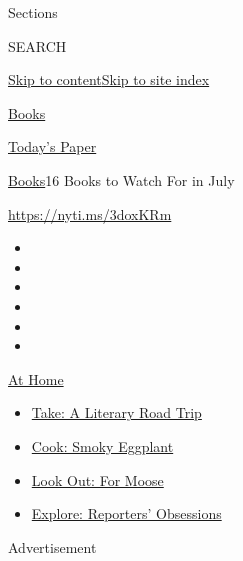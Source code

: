 Sections

SEARCH

\protect\hyperlink{site-content}{Skip to
content}\protect\hyperlink{site-index}{Skip to site index}

\href{https://www.nytimes.com/section/books}{Books}

\href{https://myaccount.nytimes.com/auth/login?response_type=cookie\&client_id=vi}{}

\href{https://www.nytimes.com/section/todayspaper}{Today's Paper}

\href{/section/books}{Books}\textbar{}16 Books to Watch For in July

\url{https://nyti.ms/3doxKRm}

\begin{itemize}
\item
\item
\item
\item
\item
\item
\end{itemize}

\href{https://www.nytimes.com/spotlight/at-home?action=click\&pgtype=Article\&state=default\&region=TOP_BANNER\&context=at_home_menu}{At
Home}

\begin{itemize}
\tightlist
\item
  \href{https://www.nytimes.com/2020/07/28/books/time-for-a-literary-road-trip.html?action=click\&pgtype=Article\&state=default\&region=TOP_BANNER\&context=at_home_menu}{Take:
  A Literary Road Trip}
\item
  \href{https://www.nytimes.com/2020/07/29/magazine/bored-with-your-home-cooking-some-smoky-eggplant-will-fix-that.html?action=click\&pgtype=Article\&state=default\&region=TOP_BANNER\&context=at_home_menu}{Cook:
  Smoky Eggplant}
\item
  \href{https://www.nytimes.com/2020/07/27/travel/moose-michigan-isle-royale.html?action=click\&pgtype=Article\&state=default\&region=TOP_BANNER\&context=at_home_menu}{Look
  Out: For Moose}
\item
  \href{https://www.nytimes.com/interactive/2020/at-home/even-more-reporters-editors-diaries-lists-recommendations.html?action=click\&pgtype=Article\&state=default\&region=TOP_BANNER\&context=at_home_menu}{Explore:
  Reporters' Obsessions}
\end{itemize}

Advertisement

